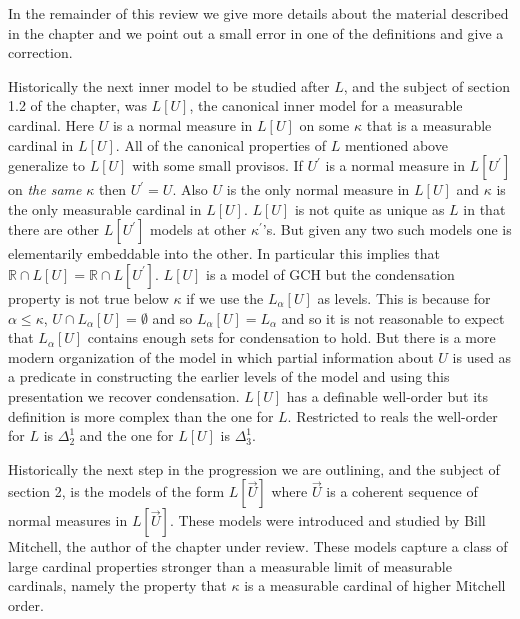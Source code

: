 \documentclass[oneside,12pt]{amsart}
\begin{document}
In the remainder of this review we give more details about the
material described in the chapter and we point out a small error in one
of the definitions and give a correction.

Historically the next inner model to be studied after $L$, and the subject
of section 1.2 of the chapter, was $L[U]$, the canonical inner model
for a measurable cardinal. Here $U$ is a normal measure in $L[U]$ on some
$\kappa$ that is a measurable cardinal in $L[U]$. All of the canonical
properties of $L$ mentioned above generalize to $L[U]$ with some small provisos.
If $U^{\prime}$ is a normal measure in $L[U^{\prime}]$ on \emph{the same} $\kappa$
then $U^{\prime}=U$. Also $U$ is the only normal measure in $L[U]$ and $\kappa$ is the
only measurable cardinal in $L[U]$. $L[U]$ is not quite as unique as $L$ in that there
are other $L[U^{\prime}]$ models at other $\kappa^{\prime}$'s. But given any two such models one is
elementarily embeddable into the other. In particular this implies that
$\mathbb{R}\cap L[U] = \mathbb{R}\cap L[U^{\prime}]$.
$L[U]$ is a model of GCH but the condensation
property is not true below $\kappa$ if we use the $L_{\alpha}[U]$ as levels.
This is because for $\alpha\leq\kappa$, $U\cap L_{\alpha}[U]=\emptyset$ and
so $L_{\alpha}[U]=L_{\alpha}$ and so it is not reasonable to expect that
$L_{\alpha}[U]$ contains enough sets for condensation to hold. But there is a more
modern organization of the model in which partial information about $U$ is
used as a predicate in constructing the earlier levels of the model and using
this presentation we recover condensation. $L[U]$ has a definable well-order but its
definition is more complex than the one for $L$. Restricted to reals the well-order
for $L$ is $\Delta^1_2$ and the one for $L[U]$ is $\Delta^1_3$.

Historically the next step in the progression we are outlining, and the subject
of section 2, is the models of the form
$L[\vec{U}]$ where $\vec{U}$ is a coherent sequence of normal measures in
$L[\vec{U}]$. These models were introduced and studied by Bill Mitchell, the
author of the chapter under review. These models capture a class of large cardinal properties
stronger than a measurable limit of measurable cardinals, namely the property that
$\kappa$ is a measurable cardinal of higher Mitchell order.
\end{document}
